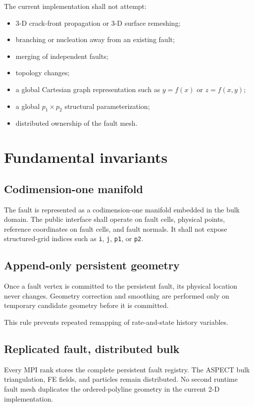 \documentclass[11pt]{article}
\begin{document}
The current implementation shall not attempt:
\begin{itemize}
  \item 3-D crack-front propagation or 3-D surface remeshing;
  \item branching or nucleation away from an existing fault;
  \item merging of independent faults;
  \item topology changes;
  \item a global Cartesian graph representation such as $y=f(x)$ or $z=f(x,y)$;
  \item a global $p_1\times p_2$ structural parameterization;
  \item distributed ownership of the fault mesh.
\end{itemize}

\section{Fundamental invariants}

\subsection{Codimension-one manifold}
The fault is represented as a codimension-one manifold embedded in the bulk domain.  The public interface shall operate on fault cells, physical points, reference coordinates on fault cells, and fault normals.  It shall not expose structured-grid indices such as \texttt{i}, \texttt{j}, \texttt{p1}, or \texttt{p2}.

\subsection{Append-only persistent geometry}
Once a fault vertex is committed to the persistent fault, its physical location never changes.  Geometry correction and smoothing are performed only on temporary candidate geometry before it is committed.

This rule prevents repeated remapping of rate-and-state history variables.

\subsection{Replicated fault, distributed bulk}
Every MPI rank stores the complete persistent fault registry. The ASPECT bulk
triangulation, FE fields, and particles remain distributed. No second runtime
fault mesh duplicates the ordered-polyline geometry in the current 2-D
implementation.
\end{document}
